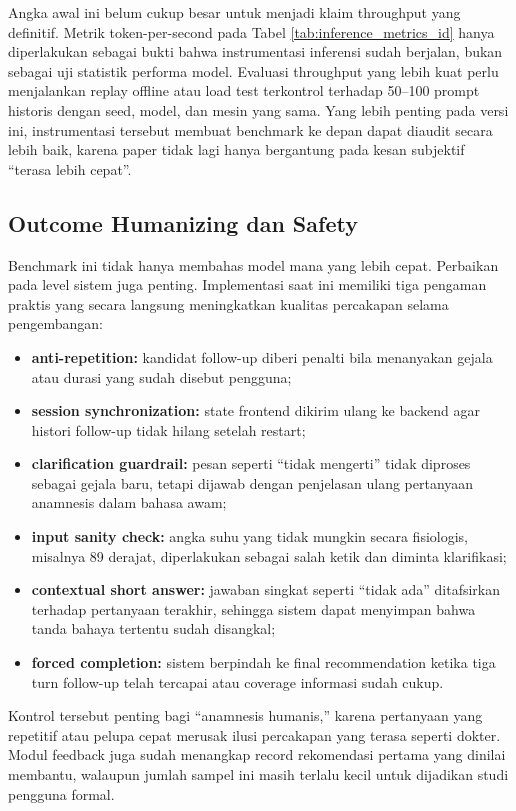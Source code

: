\documentclass[conference]{IEEEtran}
\begin{document}
Angka awal ini belum cukup besar untuk menjadi klaim throughput yang definitif. Metrik token-per-second pada Tabel \ref{tab:inference_metrics_id} hanya diperlakukan sebagai bukti bahwa instrumentasi inferensi sudah berjalan, bukan sebagai uji statistik performa model. Evaluasi throughput yang lebih kuat perlu menjalankan replay offline atau load test terkontrol terhadap 50--100 prompt historis dengan seed, model, dan mesin yang sama. Yang lebih penting pada versi ini, instrumentasi tersebut membuat benchmark ke depan dapat diaudit secara lebih baik, karena paper tidak lagi hanya bergantung pada kesan subjektif ``terasa lebih cepat''.

\subsection{Outcome Humanizing dan Safety}
Benchmark ini tidak hanya membahas model mana yang lebih cepat. Perbaikan pada level sistem juga penting. Implementasi saat ini memiliki tiga pengaman praktis yang secara langsung meningkatkan kualitas percakapan selama pengembangan:
\begin{itemize}
\item \textbf{anti-repetition:} kandidat follow-up diberi penalti bila menanyakan gejala atau durasi yang sudah disebut pengguna;
\item \textbf{session synchronization:} state frontend dikirim ulang ke backend agar histori follow-up tidak hilang setelah restart;
\item \textbf{clarification guardrail:} pesan seperti ``tidak mengerti'' tidak diproses sebagai gejala baru, tetapi dijawab dengan penjelasan ulang pertanyaan anamnesis dalam bahasa awam;
\item \textbf{input sanity check:} angka suhu yang tidak mungkin secara fisiologis, misalnya 89 derajat, diperlakukan sebagai salah ketik dan diminta klarifikasi;
\item \textbf{contextual short answer:} jawaban singkat seperti ``tidak ada'' ditafsirkan terhadap pertanyaan terakhir, sehingga sistem dapat menyimpan bahwa tanda bahaya tertentu sudah disangkal;
\item \textbf{forced completion:} sistem berpindah ke final recommendation ketika tiga turn follow-up telah tercapai atau coverage informasi sudah cukup.
\end{itemize}

Kontrol tersebut penting bagi ``anamnesis humanis,'' karena pertanyaan yang repetitif atau pelupa cepat merusak ilusi percakapan yang terasa seperti dokter. Modul feedback juga sudah menangkap record rekomendasi pertama yang dinilai membantu, walaupun jumlah sampel ini masih terlalu kecil untuk dijadikan studi pengguna formal.
\end{document}
